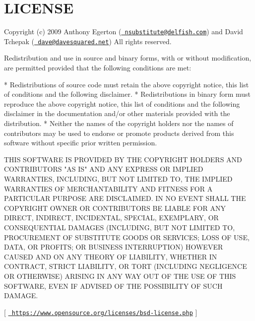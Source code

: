 \chapter{LICENSE}
\hypertarget{md__hey_tea_9_2_library_2_package_cache_2net_8tnrd_8nsubstitute_0d449712b25a_2_l_i_c_e_n_s_e}{}\label{md__hey_tea_9_2_library_2_package_cache_2net_8tnrd_8nsubstitute_0d449712b25a_2_l_i_c_e_n_s_e}
Copyright (c) 2009 Anthony Egerton (\href{mailto:nsubstitute@delfish.com}{\texttt{ nsubstitute@delfish.\+com}}) and David Tchepak (\href{mailto:dave@davesquared.net}{\texttt{ dave@davesquared.\+net}}) All rights reserved.

Redistribution and use in source and binary forms, with or without modification, are permitted provided that the following conditions are met\+: \begin{DoxyVerb}* Redistributions of source code must retain the above copyright notice,
this list of conditions and the following disclaimer.
* Redistributions in binary form must reproduce the above copyright notice,
this list of conditions and the following disclaimer in the documentation
and/or other materials provided with the distribution.
* Neither the names of the copyright holders nor the names of 
contributors may be used to endorse or promote products derived from this
software without specific prior written permission.
\end{DoxyVerb}
 THIS SOFTWARE IS PROVIDED BY THE COPYRIGHT HOLDERS AND CONTRIBUTORS "{}\+AS IS"{} AND ANY EXPRESS OR IMPLIED WARRANTIES, INCLUDING, BUT NOT LIMITED TO, THE IMPLIED WARRANTIES OF MERCHANTABILITY AND FITNESS FOR A PARTICULAR PURPOSE ARE DISCLAIMED. IN NO EVENT SHALL THE COPYRIGHT OWNER OR CONTRIBUTORS BE LIABLE FOR ANY DIRECT, INDIRECT, INCIDENTAL, SPECIAL, EXEMPLARY, OR CONSEQUENTIAL DAMAGES (INCLUDING, BUT NOT LIMITED TO, PROCUREMENT OF SUBSTITUTE GOODS OR SERVICES; LOSS OF USE, DATA, OR PROFITS; OR BUSINESS INTERRUPTION) HOWEVER CAUSED AND ON ANY THEORY OF LIABILITY, WHETHER IN CONTRACT, STRICT LIABILITY, OR TORT (INCLUDING NEGLIGENCE OR OTHERWISE) ARISING IN ANY WAY OUT OF THE USE OF THIS SOFTWARE, EVEN IF ADVISED OF THE POSSIBILITY OF SUCH DAMAGE.

\mbox{[} \href{https://www.opensource.org/licenses/bsd-license.php}{\texttt{ https\+://www.\+opensource.\+org/licenses/bsd-\/license.\+php}} \mbox{]} 